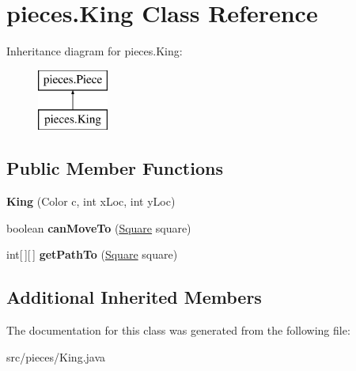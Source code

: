 \hypertarget{classpieces_1_1_king}{\section{pieces.\-King Class Reference}
\label{classpieces_1_1_king}
}
Inheritance diagram for pieces.\-King\-:\begin{figure}[H]
\begin{center}
\leavevmode
\includegraphics[height=2.000000cm]{classpieces_1_1_king}
\end{center}
\end{figure}
\subsection*{Public Member Functions}
\begin{DoxyCompactItemize}
\item 
\hypertarget{classpieces_1_1_king_aa9a279ba17536c092c053c98ff3c82c7}{{\bfseries King} (Color c, int x\-Loc, int y\-Loc)}\label{classpieces_1_1_king_aa9a279ba17536c092c053c98ff3c82c7}

\item 
\hypertarget{classpieces_1_1_king_a5288c507b0dd3c1eb0423559b6d56cc5}{boolean {\bfseries can\-Move\-To} (\hyperlink{classboard_1_1_square}{Square} square)}\label{classpieces_1_1_king_a5288c507b0dd3c1eb0423559b6d56cc5}

\item 
\hypertarget{classpieces_1_1_king_a9118974e08705ddb6723bec714c29189}{int\mbox{[}$\,$\mbox{]}\mbox{[}$\,$\mbox{]} {\bfseries get\-Path\-To} (\hyperlink{classboard_1_1_square}{Square} square)}\label{classpieces_1_1_king_a9118974e08705ddb6723bec714c29189}

\end{DoxyCompactItemize}
\subsection*{Additional Inherited Members}


The documentation for this class was generated from the following file\-:\begin{DoxyCompactItemize}
\item 
src/pieces/King.\-java\end{DoxyCompactItemize}
